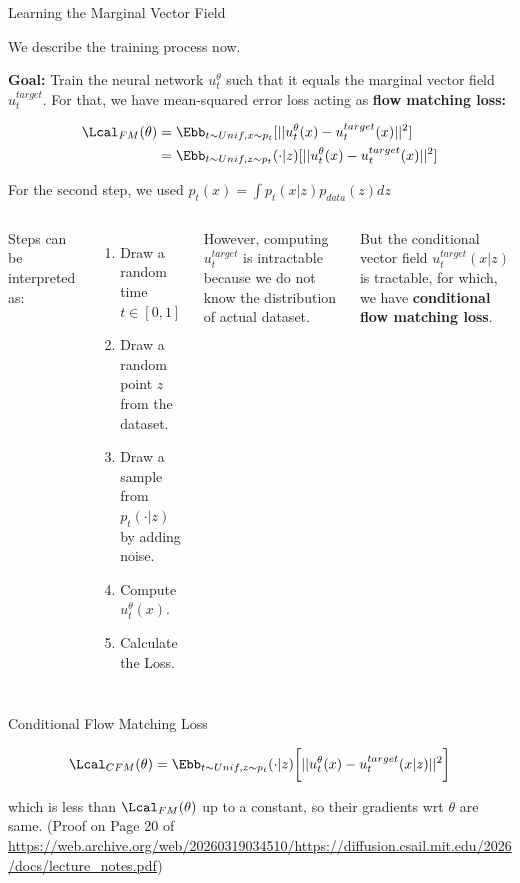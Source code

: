 \documentclass[aspectratio=169,xcolor=dvipsnames,svgnames,x11names,fleqn]{beamer}
\begin{document}
\begin{frame}{Learning the Marginal Vector Field}


    \footnotesize

    We describe the training process now.

\vspace{5pt}

\textbf{\color{androidRed}Goal:} Train the neural network $u_t^\theta$ such that it equals the marginal vector field $u_t^{target}$. For that, we have mean-squared error loss acting as \textbf{flow matching loss:}

\begin{align*}
\Lcal_{FM}(\theta) & = \Ebb_{t\sim Unif,x \sim p_t}[ || u_t^\theta(x) - u_t^{target}(x) ||^2]    \\
& =  \Ebb_{t\sim Unif,z \sim p_t}(\cdot | z)[ || u_t^\theta(x) - u_t^{target}(x) ||^2]
\end{align*}

\vspace{5pt}
For the second step, we used $p_t(x) = \int p_t(x|z)p_{data}(z) dz$


\begin{columns}

    Steps can be interpreted as:

\begin{enumerate}
    \item Draw a random time $t \in[0, 1]$
    \item Draw a random point $z$ from the dataset.
    \item Draw a sample from $p_t(\cdot | z)$ by adding noise.
    \item Compute $u_t^\theta (x)$.
    \item Calculate the Loss.
\end{enumerate}

\pause 
    

However, computing $u_t^{target}$ is intractable because we do not know the distribution of actual dataset.

\vspace{10pt}

But the conditional vector field $u_t^{target}(x|z)$  is tractable, for which, we have \textbf{conditional flow matching loss}.
\end{columns}
\end{frame}


\begin{frame}{Conditional Flow Matching Loss}

    $$
    \Lcal_{CFM}(\theta) = \Ebb_{t\sim Unif,z \sim p_t}(\cdot | z)\bigg[ || u_t^\theta(x) - u_t^{target}(x|z) ||^2\bigg]
    $$

    which is less than $\Lcal_{FM}(\theta)$ up to a constant, so their gradients wrt $\theta$ are same. (Proof on Page 20 of  \url{https://web.archive.org/web/20260319034510/https://diffusion.csail.mit.edu/2026/docs/lecture_notes.pdf})

\end{frame}
\end{document}
